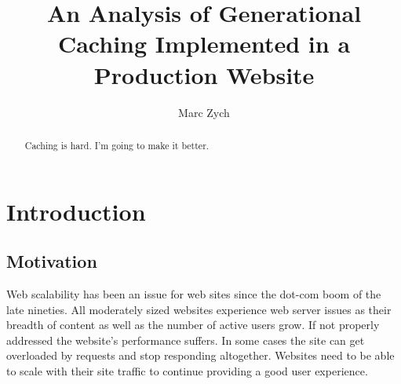 \documentclass[12pt]{ucthesis}
\begin{document}

\title{An Analysis of Generational Caching Implemented in a Production Website}
\author{Marc Zych}
  
 
     



\maketitle

\begin{frontmatter}

\copyrightpage

\committeemembershippage

\begin{abstract}

Caching is hard. I'm going to make it better.

\end{abstract}


\tableofcontents


\listoftables

\listoffigures

\end{frontmatter}

\pagestyle{plain}




\renewcommand{\baselinestretch}{1.66}


\chapter{Introduction}
\label{introduction}

\section{Motivation}
Web scalability has been an issue for web sites since the dot-com boom of the late nineties. %
All moderately sized websites experience web server issues as their breadth of content as well as the number of active users grow.
If not properly addressed the website's performance suffers.
In some cases the site can get overloaded by requests and stop responding altogether.
Websites need to be able to scale with their site traffic to continue providing a good user experience.
\end{document}
